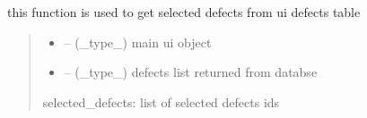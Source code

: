 \documentclass[letterpaper,10pt,english]{sphinxmanual}
\begin{document}
\begin{savenotes}\begin{fulllineitems}
\label{\detokenize{setting/backend/defect_management_funcs:oxin.backend.defect_management_funcs.get_selected_defects}}
\pysigstartsignatures
{}
\pysigstopsignatures
\sphinxAtStartPar
this function is used to get selected defects from ui defects table
\begin{quote}\begin{description}
\begin{itemize}
\item {} 
\sphinxAtStartPar
{} – (\_type\_) main ui object

\item {} 
\sphinxAtStartPar
{} – (\_type\_) defects list returned from databse

\end{itemize}

\sphinxAtStartPar
selected\_defects: list of selected defects ids

\end{description}\end{quote}

\end{fulllineitems}\end{savenotes}

\end{document}

